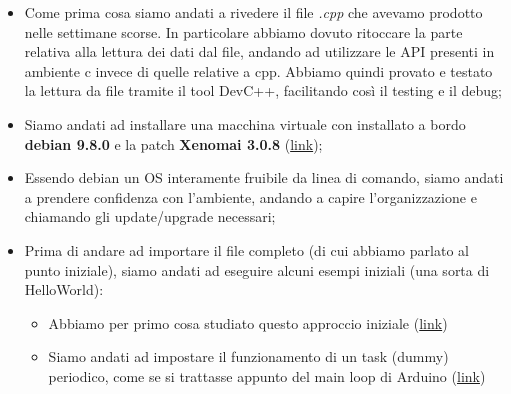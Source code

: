 \begin{itemize}
	\item Come prima cosa siamo andati a rivedere il file \textit{.cpp} che avevamo prodotto nelle settimane scorse. In particolare abbiamo dovuto ritoccare la parte relativa alla lettura dei dati dal file, andando ad utilizzare le API presenti in ambiente c invece di quelle relative a cpp.
	Abbiamo quindi provato e testato la lettura da file tramite il tool DevC++, facilitando così il testing e il debug;
	\item Siamo andati ad installare una macchina virtuale con installato a bordo \textbf{debian 9.8.0} e la patch \textbf{Xenomai 3.0.8} (\href{http://www.cs.ru.nl/lab/xenomai/}{link});
	\item Essendo debian un OS interamente fruibile da linea di comando, siamo andati a prendere confidenza con l'ambiente, andando a capire l'organizzazione e chiamando gli update/upgrade necessari;
	\item Prima di andare ad importare il file completo (di cui abbiamo parlato al punto iniziale), siamo andati ad eseguire alcuni esempi iniziali (una sorta di HelloWorld):
	\begin{itemize}
		\item Abbiamo per primo cosa studiato questo approccio iniziale (\href{http://www.cs.ru.nl/J.Hooman/DES/XenomaiExercises/Exercise-1.html}{link})
		\item Siamo andati ad impostare il funzionamento di un task (dummy) periodico, come se si trattasse appunto del main loop di Arduino (\href{http://www.cs.ru.nl/lab/xenomai/}{link})
	\end{itemize}
	

\end{itemize}
